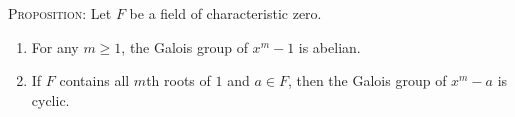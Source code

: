 \documentclass[12pt]{amsart}
\newcommand{\Bold}[1]{\contour{black}{#1}}
\newcommand{\Q}{\mathbb{Q}}
\newcommand{\solution}[1]{\ifthenelse {\equal{\displaysol}{1}} {\begin{framed}{\color{meretale}\noindent #1}\end{framed}} { \ }}
\newcommand{\nosolpage}{\ifthenelse {\equal{\displaysol}{1}} {} {\newpage}}
\newcommand\itema{\stepcounter{enumii}\item[{\Bold{(\theenumii)}}]}
\begin{document}
%
%
%
%
	
	\nosolpage
	
	\begin{framed}
	\textsc{Proposition:} Let $F$ be a field of characteristic zero.
	\begin{enumerate}
	\item For any $m\geq 1$, the Galois group of $x^m-1$ is abelian.
	\item If $F$ contains all $m$th roots of $1$ and $a\in F$, then the Galois group of $x^m-a$ is cyclic.
	\end{enumerate}
	\end{framed}
	
\end{document}
